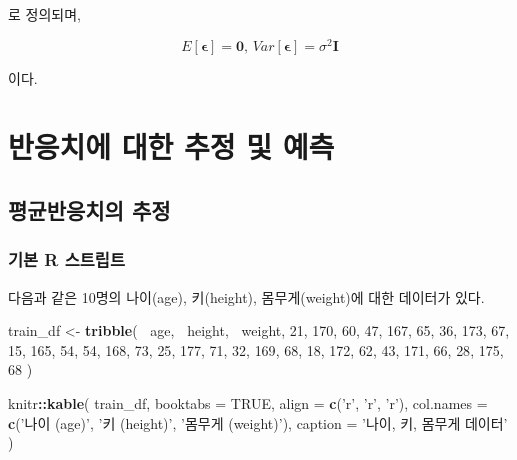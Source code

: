 \documentclass[]{book}
\newenvironment{Shaded}{\begin{snugshade}}{\end{snugshade}}
\newcommand{\DataTypeTok}[1]{\textcolor[rgb]{0.13,0.29,0.53}{#1}}
\newcommand{\DecValTok}[1]{\textcolor[rgb]{0.00,0.00,0.81}{#1}}
\newcommand{\KeywordTok}[1]{\textcolor[rgb]{0.13,0.29,0.53}{\textbf{#1}}}
\newcommand{\NormalTok}[1]{#1}
\newcommand{\OperatorTok}[1]{\textcolor[rgb]{0.81,0.36,0.00}{\textbf{#1}}}
\newcommand{\OtherTok}[1]{\textcolor[rgb]{0.56,0.35,0.01}{#1}}
\newcommand{\StringTok}[1]{\textcolor[rgb]{0.31,0.60,0.02}{#1}}
\begin{document}
로 정의되며,

\[
E[\boldsymbol{\epsilon}] = \mathbf{0}, \, Var[\boldsymbol{\epsilon}] = \sigma^2 \mathbf{I} 
\]

이다.

\hypertarget{regression-response-confidence-prediction}{%
\section{반응치에 대한 추정 및 예측}\label{regression-response-confidence-prediction}}

\hypertarget{regression-response-confidence}{%
\subsection{평균반응치의 추정}\label{regression-response-confidence}}

\hypertarget{regression-response-confidence-basic-script}{%
\subsubsection{기본 R 스트립트}\label{regression-response-confidence-basic-script}}

다음과 같은 10명의 나이(age), 키(height), 몸무게(weight)에 대한 데이터가 있다.

\begin{Shaded}
\begin{Highlighting}[]
\NormalTok{train_df <-}\StringTok{ }\KeywordTok{tribble}\NormalTok{(}
  \OperatorTok{~}\NormalTok{age, }\OperatorTok{~}\NormalTok{height, }\OperatorTok{~}\NormalTok{weight,}
  \DecValTok{21}\NormalTok{, }\DecValTok{170}\NormalTok{, }\DecValTok{60}\NormalTok{,}
  \DecValTok{47}\NormalTok{, }\DecValTok{167}\NormalTok{, }\DecValTok{65}\NormalTok{,}
  \DecValTok{36}\NormalTok{, }\DecValTok{173}\NormalTok{, }\DecValTok{67}\NormalTok{,}
  \DecValTok{15}\NormalTok{, }\DecValTok{165}\NormalTok{, }\DecValTok{54}\NormalTok{,}
  \DecValTok{54}\NormalTok{, }\DecValTok{168}\NormalTok{, }\DecValTok{73}\NormalTok{,}
  \DecValTok{25}\NormalTok{, }\DecValTok{177}\NormalTok{, }\DecValTok{71}\NormalTok{,}
  \DecValTok{32}\NormalTok{, }\DecValTok{169}\NormalTok{, }\DecValTok{68}\NormalTok{,}
  \DecValTok{18}\NormalTok{, }\DecValTok{172}\NormalTok{, }\DecValTok{62}\NormalTok{,}
  \DecValTok{43}\NormalTok{, }\DecValTok{171}\NormalTok{, }\DecValTok{66}\NormalTok{,}
  \DecValTok{28}\NormalTok{, }\DecValTok{175}\NormalTok{, }\DecValTok{68}
\NormalTok{)}

\NormalTok{knitr}\OperatorTok{::}\KeywordTok{kable}\NormalTok{(}
\NormalTok{  train_df, }\DataTypeTok{booktabs =} \OtherTok{TRUE}\NormalTok{,}
  \DataTypeTok{align =} \KeywordTok{c}\NormalTok{(}\StringTok{'r'}\NormalTok{, }\StringTok{'r'}\NormalTok{, }\StringTok{'r'}\NormalTok{),}
  \DataTypeTok{col.names =} \KeywordTok{c}\NormalTok{(}\StringTok{'나이 (age)'}\NormalTok{, }\StringTok{'키 (height)'}\NormalTok{, }\StringTok{'몸무게 (weight)'}\NormalTok{),}
  \DataTypeTok{caption =} \StringTok{'나이, 키, 몸무게 데이터'}
\NormalTok{)}
\end{Highlighting}
\end{Shaded}
\end{document}
